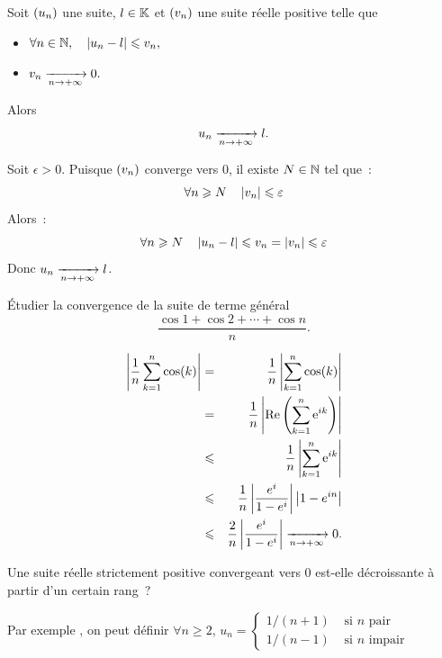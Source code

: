 \documentclass{magnoliaold}
\begin{document}




\begin{proposition}[utile=-3]
Soit $\left(u_n\right)$ une suite, $l\in\mathbb{K}$ et $\left(v_n\right)$ une suite réelle
positive telle que
\begin{itemize}
\item $\forall n\in\mathbb{N} ,\quad \left|u_n-l\right|\leqslant v_n,$
\item $v_n\xrightarrow[n\rightarrow +\infty]{} 0.$
\end{itemize}
Alors
\[u_n \xrightarrow[n\rightarrow +\infty]{} l.\]
\end{proposition}

\begin{preuve}
Soit $\epsilon>0$. Puisque $\left(v_n\right)$ converge vers 0, il existe $N\in\mathbb{N}$ tel
que~:
\[\forall n\geqslant N \quad \left|v_n\right|\leqslant\varepsilon\]
Alors~:
\[\forall n\geqslant N \quad \left|u_n-l\right|\leqslant v_n=\left|v_n\right|\leqslant\varepsilon\]
Donc $u_n\xrightarrow[n\rightarrow +\infty]{} l$.
\end{preuve}

\begin{exos}
\exo Étudier la convergence de la suite de terme général
  \[\frac{\cos 1+\cos 2+\cdots+\cos n}{n}.\]
  
  \begin{sol}
  \begin{eqnarray*}
  \left|\frac{1}{n}\sum_{k=1}^n\cos(k)\right|&=&\frac{1}{n}\left|\sum_{k=1}^n\cos(k)\right|\\
  &=&\frac{1}{n}\left|\mathop{\rm Re}\left(\sum_{k=1}^n{\rm e}^{ik}\right)\right|\\
  &\leqslant& \frac{1}{n}\left|\sum_{k=1}^n{\rm e}^{ik}\right|\\
  &\leqslant& \frac{1}{n}\left|\frac{e^i}{1-e^i}\right|\left|1-e^{in}\right|\\
  &\leqslant& \frac{2}{n}\left|\frac{e^i}{1-e^i}\right|\xrightarrow[n\rightarrow +\infty]{}{0}.
  \end{eqnarray*}
  \end{sol}
\exo Une suite réelle strictement positive convergeant vers 0 est-elle
  décroissante à partir d'un certain rang~?
  \begin{sol}
  Par exemple , on peut définir $\forall n\geq 2$, $u_n=\begin{cases}1/(n+1) &\text{ si } n \text{ pair}\\
  1/(n-1) &\text{ si } n \text{ impair}
  \end{cases}$ 
  \end{sol}
\end{exos}
\end{document}
